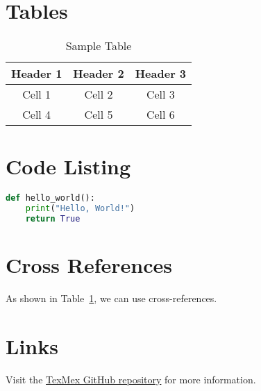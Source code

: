 \documentclass{article}
\begin{document}
\section{Tables}
\begin{table}[h]
    \centering
    \begin{tabular}{|c|c|c|}
        \hline
        \textbf{Header 1} & \textbf{Header 2} & \textbf{Header 3} \\
        \hline
        Cell 1 & Cell 2 & Cell 3 \\
        Cell 4 & Cell 5 & Cell 6 \\
        \hline
    \end{tabular}
    \caption{Sample Table}
    \label{tab:sample}
\end{table}

\section{Code Listing}
\begin{lstlisting}[language=Python]
def hello_world():
    print("Hello, World!")
    return True
\end{lstlisting}

\section{Cross References}
As shown in Table~\ref{tab:sample}, we can use cross-references.

\section{Links}
Visit the \href{https://github.com/RahulChalla/texmex}{TexMex GitHub repository} for more information.
\end{document}
